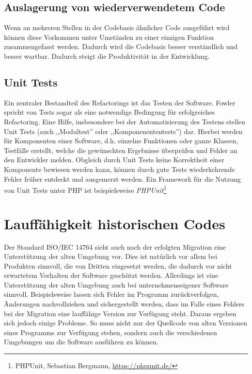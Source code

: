     \subsection{Auslagerung von wiederverwendetem Code}
    Wenn an mehreren Stellen in der Codebasis ähnlicher Code ausgeführt wird können diese Vorkommen unter Umständen zu einer 
    einzigen Funktion zusammengefasst werden.\cite[S. 63]{fowler_refactoring_1999} Dadurch wird die Codebasis besser verständlich 
    und besser wartbar. Dadurch steigt die Produktivität in der Entwicklung.\cite{martin_clean_2012}    
    \subsection{Unit Tests}
    Ein zentraler Bestandteil des Refactorings ist das Testen der Software. 
    Fowler spricht von Tests sogar als eine notwendige Bedingung für erfolgreiches Refactoring.\cite[S. 73]{fowler_refactoring_1999} 
    Eine Hilfe, insbesondere bei der Automatisierung des Testens stellen Unit Tests (auch ,,Modultest'' oder ,,Komponenententests'')
    dar. Hierbei werden für Komponenten einer Software, d.h. einzelne Funktionen oder ganze Klassen, Testfälle erstellt, welche 
    die gewünschten Ergebnisse überprüfen und Fehler an den Entwickler melden. Obgleich durch Unit Tests keine Korrektheit einer 
    Komponente bewiesen werden kann, können durch gute Tests wiederkehrende Fehler früher entdeckt und ausgemerzt werden. 
    Ein Framework für die Nutzung von Unit Tests unter \ac{PHP} ist beispielsweise \textit{PHPUnit}\footnote{PHPUnit, Sebastian Bergmann, \url{https://phpunit.de/}} 

\section{Lauffähigkeit historischen Codes}\label{VCS}
    Der Standard ISO/IEC 14764 sieht auch nach der erfolgten Migration eine Unterstützung der alten Umgebung vor. Dies ist natürlich vor allem bei Produkten sinnvoll, 
    die von Dritten eingesetzt werden, die dadurch vor nicht erwartetem Verhalten der Software geschützt werden. Allerdings ist eine Unterstützung der alten Umgebung 
    auch bei unternehmenseigener Software sinnvoll. Beispielsweise lassen sich Fehler im Programm zurückverfolgen, Änderungen nachvollziehen und sichergestellt werden,
    dass im Falle eines Fehlers bei der Migration eine lauffähige Version zur Verfügung steht. Daraus ergeben sich jedoch einige Probleme. So muss nicht nur der Quellcode 
    von alten Versionen eines Programms zur Verfügung stehen, sondern auch die verschiedenen Umgebungen um die Software ausführen zu können.
